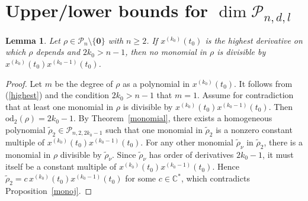 \documentclass[11pt]{amsart}
\numberwithin{equation}{section}
\newcommand{\di}{\displaystyle}
\newtheorem{lemma}[thm]{Lemma}
\newcommand{\bc}{\mathbb{C}}
\newcommand{\sd}{\mathrm{od}}
\newcommand{\scp}{\mathscr{P}}
\newcommand{\pn}{\mathscr{P}_{n}}
\newcommand{\pndl}{\mathscr{P}_{n, d, l}}
\newcommand{\zero}{\mathbf{0}}
\begin{document}
\section{Upper/lower bounds for $\di \dim \pndl$ \label{1.2}}

\begin{lemma} \label{2factors}
Let $\rho\in\pn \setminus \{\zero\}$ with $n\ge2$. If $x^{(k_0)}(t_0)$ is the highest derivative on which $\rho$ depends and $2k_0>n-1$, then no monomial in $\rho$ is divisible by $x^{(k_0)}(t_0)x^{(k_0-1)}(t_0)$.
\end{lemma}
\begin{proof}
Let $m$ be the degree of $\rho$ as a polynomial in $x^{(k_0)}(t_0)$. It follows from (\ref{highest}) and the condition $2k_0>n-1$ that $m=1$. Assume for contradiction that at least one monomial in $\rho$ is divisible by $x^{(k_0)}(t_0)x^{(k_0-1)}(t_0)$.
Then $\sd_2(\rho)=2k_0-1$. By Theorem~\ref{monomial}, there exists a homogeneous polynomial $\tilde{\rho}_2 \in \scp_{n,2,2k_0-1}$ such that one monomial in $\tilde{\rho}_2$ is a nonzero constant multiple of $x^{(k_0)}(t_0)x^{(k_0-1)}(t_0)$. For any other monomial $\tilde{\rho}_\nu$ in $\tilde{\rho}_2$, there is a monomial in $\rho$ divisible by $\tilde{\rho}_\nu$.
Since $\tilde{\rho}_\nu$ has order of derivatives $2k_0-1$, it must itself be a constant multiple of $x^{(k_0)}(t_0)x^{(k_0-1)}(t_0)$.
Hence $\tilde{\rho}_2=c\,x^{(k_0)}(t_0)x^{(k_0-1)}(t_0)$ for some $c\in\bc^{\ast}$, which contradicts Proposition~\ref{monoj}.
\end{proof}
\end{document}
